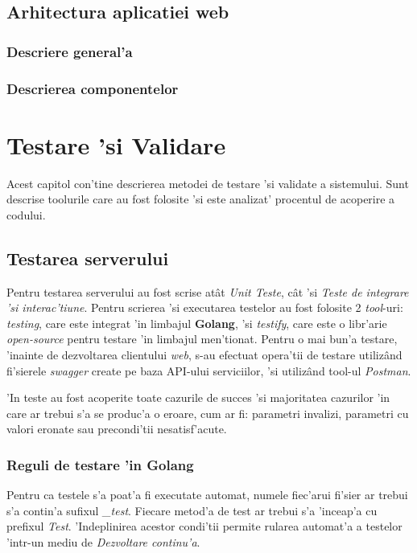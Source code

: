 \documentclass[12pt,a4paper,twoside]{report}
\begin{document}
\section{Arhitectura aplicatiei web}
\subsection{Descriere general'a}
\subsection{Descrierea componentelor}


\chapter{Testare 'si Validare}
Acest capitol con'tine descrierea metodei de testare 'si validate a sistemului. Sunt descrise toolurile care au fost folosite 'si este analizat' procentul de acoperire a codului.

\section{Testarea serverului}
Pentru testarea serverului au fost scrise atât \textit{Unit Teste}, cât 'si \textit{Teste de integrare 'si interac'tiune}. Pentru scrierea 'si executarea testelor au fost folosite 2 \textit{tool}-uri: \textit{testing}, care este integrat 'in limbajul \textbf{Golang}, 'si \textit{testify}, care este o libr'arie \textit{open-source} pentru testare 'in limbajul men'tionat. Pentru o mai bun'a testare, 'inainte de dezvoltarea clientului \textit{web}, s-au efectuat opera'tii de testare utilizând fi'sierele \textit{swagger} create pe baza API-ului serviciilor, 'si utilizând tool-ul \textit{Postman}.

'In teste au fost acoperite toate cazurile de succes 'si majoritatea cazurilor 'in care ar trebui s'a se produc'a o eroare, cum ar fi: parametri invalizi, parametri cu valori eronate sau precondi'tii nesatisf'acute.

\subsection{Reguli de testare 'in Golang}
Pentru ca testele s'a poat'a fi executate automat, numele fiec'arui fi'sier ar trebui s'a contin'a sufixul \textit{\_test}. Fiecare metod'a de test ar trebui s'a 'inceap'a cu prefixul \textit{Test}. 'Indeplinirea acestor condi'tii permite rularea automat'a a testelor 'intr-un mediu de \textit{Dezvoltare continu'a}.
\end{document}
